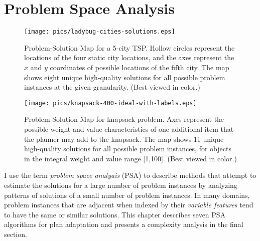 \chapter{Problem Space Analysis}
\thispagestyle{plain}

\label{ch:psa}

\begin{figure}
\centering
\texttt{[image: pics/ladybug-cities-solutions.eps]}
\caption{Problem-Solution Map for a 5-city TSP.  Hollow circles represent the locations of the four static city locations, and the axes represent the $x$ and $y$ coordinates of possible locations of the fifth city.  The map shows eight unique high-quality solutions for all possible problem instances at the given granularity.  (Best viewed in color.)}
\label{fig:ps-map-ladybug-marked-cities}
\end{figure}

\begin{figure}
\centering
\texttt{[image: pics/knapsack-400-ideal-with-labels.eps]}
\caption{Problem-Solution Map for knapsack problem.  Axes represent the possible weight and value characteristics of one additional item that the planner may add to the knapsack.  The map shows 11 unique high-quality solutions for all possible problem instances, for objects in the integral weight and value range [1,100].  (Best viewed in color.)}
\label{fig:ps-map-knapsack}
\end{figure}


I use the term \textit{problem space analyais} (PSA) to describe methods that attempt to estimate the solutions for a large number of problem instances by analyzing patterns of solutions of a small number of problem instances.  In many domains, problem instances that are adjacent when indexed by their \textit{variable features} tend to have the same or similar solutions.  This chapter describes seven PSA algorithms for plan adaptation and presents a complexity analysis in the final section.



